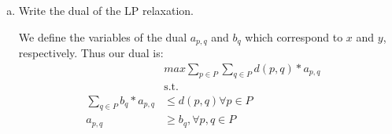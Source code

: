 \documentclass[11pt]{article}
\begin{document}
\begin{enumerate}[(a)]
\begin{solution}
    \end{solution}
    \item Write the dual of the LP relaxation.
    \begin{solution}
We define the variables of the dual $a_{p,q}$ and $b_q$ which correspond to $x$ and $y$, respectively. Thus our dual is:
	\begin{align*}
& max \sum_{p \in P} \sum_{q \in P} d(p,q)* a_{p,q} & \\
& \text{s.t.  } \\
\sum_{q \in P} b_q * a_{p,q} &\leq d(p,q) \forall p \in P \\
a_{p,q} &\geq b_q, \forall p,q \in P \\
\end{align*}

    \end{solution}
\end{enumerate}

\clearpage
\end{document}
